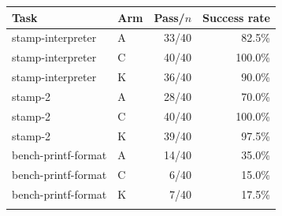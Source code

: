 \begin{tabular}{llrr}
\toprule
Task & Arm & Pass/$n$ & Success rate \\
\midrule
stamp-interpreter & A & 33/40 & 82.5\% \\
stamp-interpreter & C & 40/40 & 100.0\% \\
stamp-interpreter & K & 36/40 & 90.0\% \\
\addlinespace
stamp-2 & A & 28/40 & 70.0\% \\
stamp-2 & C & 40/40 & 100.0\% \\
stamp-2 & K & 39/40 & 97.5\% \\
\addlinespace
bench-printf-format & A & 14/40 & 35.0\% \\
bench-printf-format & C & 6/40 & 15.0\% \\
bench-printf-format & K & 7/40 & 17.5\% \\
\addlinespace
\bottomrule
\end{tabular}
